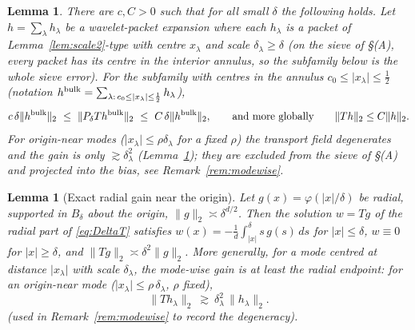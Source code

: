 \documentclass[11pt]{article}
\newtheorem{lemma}[theorem]{Lemma}
\theoremstyle{remark}
\newcommand{\norm}[1]{\lVert #1\rVert}
\newcommand{\abs}[1]{\lvert #1\rvert}
\begin{document}
\begin{lemma}\label{lem:invert}
There are $c,C>0$ such that for all small $\delta$ the following holds.
Let $h=\sum_{\lambda}h_{\lambda}$ be a wavelet-packet expansion where each
$h_{\lambda}$ is a packet of Lemma~\ref{lem:scale2}-type with centre
$x_{\lambda}$ and scale $\delta_\lambda\ge\delta$ (on the sieve of \S(A),
every packet has its centre in the interior annulus, so the subfamily
below \emph{is} the whole sieve error). For the subfamily with
centres in the annulus $c_0\le\abs{x_\lambda}\le\tfrac12$ (notation
$h^{\rm bulk}=\sum_{\lambda:\,c_0\le\abs{x_\lambda}\le\frac12}h_\lambda$),
\begin{equation}\label{eq:infsup}
c\,\delta\norm{h^{\rm bulk}}_{2}
\ \le\ \norm{P_\delta Th^{\rm bulk}}_{2}
\ \le\ C\,\delta\norm{h^{\rm bulk}}_{2},
\qquad\text{and more globally}\qquad
\norm{Th}_{2}\le C\norm{h}_{2}.
\end{equation}
For origin-near modes ($\abs{x_\lambda}\le\rho\delta_\lambda$ for a fixed
$\rho$) the transport field degenerates and the gain is only
$\gtrsim\delta_\lambda^{2}$ (Lemma~\ref{lem:origin}); they are
\emph{excluded} from the sieve of \S(A) and projected into the bias, see
Remark~\ref{rem:modewise}.
\end{lemma}
\begin{lemma}[Exact radial gain near the origin]\label{lem:origin}
Let $g(x)=\varphi(\abs x/\delta)$ be radial, supported in $B_\delta$ about
the origin, $\norm{g}_2\asymp\delta^{d/2}$. Then the solution $w=Tg$ of
the radial part of \eqref{eq:DeltaT} satisfies
$w(x)=-\frac1d\int_{\abs{x}}^{\delta}s\,g(s)\,ds$ for $\abs x\le\delta$,
$w\equiv0$ for $\abs x\ge\delta$, and
$\norm{Tg}_2\asymp\delta^{2}\norm{g}_2$. More generally, for a mode
centred at distance $\abs{x_\lambda}$ with scale $\delta_\lambda$, the
mode-wise gain is at least the radial endpoint: for an origin-near
mode ($\abs{x_\lambda}\le\rho\,\delta_\lambda$, $\rho$ fixed),
\begin{equation}\label{eq:origingain}
\norm{Th_\lambda}_2\ \gtrsim\ \delta_\lambda^{2}\,\norm{h_\lambda}_2 .
\end{equation}
(used in Remark~\ref{rem:modewise} to record the degeneracy).
\end{lemma}
\end{document}
